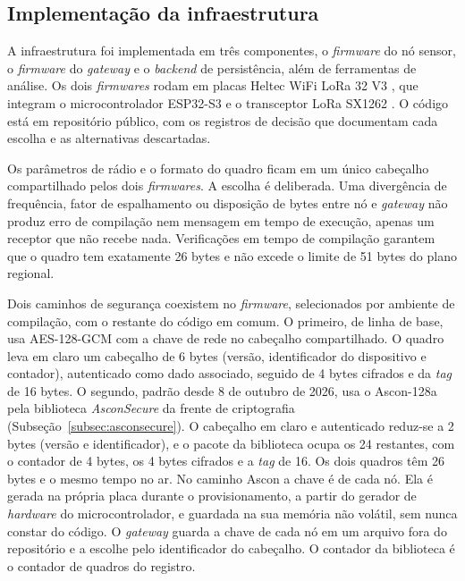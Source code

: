 \subsection{Implementação da infraestrutura}
\label{subsec:implementacao_infra}

A infraestrutura foi implementada em três componentes, o \textit{firmware} do nó sensor, o \textit{firmware} do \textit{gateway} e o \textit{backend} de persistência, além de ferramentas de análise. Os dois \textit{firmwares} rodam em placas Heltec WiFi LoRa 32 V3 \cite{heltec_wifi_lora_32_v3}, que integram o microcontrolador ESP32-S3 e o transceptor LoRa SX1262 \cite{semtech_sx1262}. O código está em repositório público, com os registros de decisão que documentam cada escolha e as alternativas descartadas.

Os parâmetros de rádio e o formato do quadro ficam em um único cabeçalho compartilhado pelos dois \textit{firmwares}. A escolha é deliberada. Uma divergência de frequência, fator de espalhamento ou disposição de bytes entre nó e \textit{gateway} não produz erro de compilação nem mensagem em tempo de execução, apenas um receptor que não recebe nada. Verificações em tempo de compilação garantem que o quadro tem exatamente 26 bytes e não excede o limite de 51 bytes do plano regional.

Dois caminhos de segurança coexistem no \textit{firmware}, selecionados por ambiente de compilação, com o restante do código em comum. O primeiro, de linha de base, usa AES-128-GCM com a chave de rede no cabeçalho compartilhado. O quadro leva em claro um cabeçalho de 6 bytes (versão, identificador do dispositivo e contador), autenticado como dado associado, seguido de 4 bytes cifrados e da \textit{tag} de 16 bytes. O segundo, padrão desde 8 de outubro de 2026, usa o Ascon-128a pela biblioteca \textit{AsconSecure} da frente de criptografia (Subseção~\ref{subsec:asconsecure}). O cabeçalho em claro e autenticado reduz-se a 2 bytes (versão e identificador), e o pacote da biblioteca ocupa os 24 restantes, com o contador de 4 bytes, os 4 bytes cifrados e a \textit{tag} de 16. Os dois quadros têm 26 bytes e o mesmo tempo no ar. No caminho Ascon a chave é de cada nó. Ela é gerada na própria placa durante o provisionamento, a partir do gerador de \textit{hardware} do microcontrolador, e guardada na sua memória não volátil, sem nunca constar do código. O \textit{gateway} guarda a chave de cada nó em um arquivo fora do repositório e a escolhe pelo identificador do cabeçalho. O contador da biblioteca é o contador de quadros do registro.


